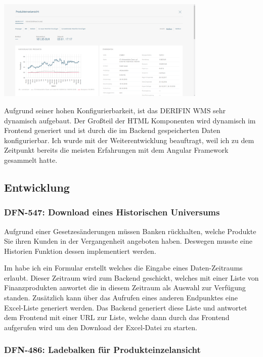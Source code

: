 \documentclass[chapterprefix=false, 12pt, a4paper, oneside, parskip=half, listof=totoc, bibliography=totoc, numbers=noendperiod]{scrbook}
\begin{document}
    \begin{center}
        \includegraphics[width=0.75\textwidth]{img/derifin.png}
    \end{center}

    Aufgrund seiner hohen Konfigurierbarkeit, ist das DERIFIN WMS sehr dynamisch aufgebaut. Der Großteil der HTML Komponenten
    wird dynamisch im Frontend generiert und ist durch die im Backend gespeicherten Daten konfigurierbar. Ich wurde mit
    der Weiterentwicklung beauftragt, weil ich zu dem Zeitpunkt bereits die meisten Erfahrungen mit dem Angular Framework gesammelt hatte.

    \subsection{Entwicklung}

    \subsubsection{DFN-547: Download eines Historischen Universums}

    Aufgrund einer Gesetzesänderungen müssen Banken rückhalten, welche Produkte Sie ihren Kunden in der Vergangenheit
    angeboten haben. Deswegen musste eine Historien Funktion dessen implementiert werden.

    Im habe ich ein Formular erstellt welches die Eingabe eines Daten-Zeitraums erlaubt. Dieser Zeitraum wird zum
    Backend geschickt, welches mit einer Liste von Finanzprodukten anwortet die in diesem Zeitraum als Auswahl zur Verfügung
    standen. Zusätzlich kann über das Aufrufen eines anderen Endpunktes eine Excel-Liste generiert werden. Das Backend generiert
    diese Liste und antwortet dem Frontend mit einer URL zur Liste, welche dann durch das Frontend aufgerufen wird um den
    Download der Excel-Datei zu starten.

    \subsubsection{DFN-486: Ladebalken für Produkteinzelansicht}
\end{document}
